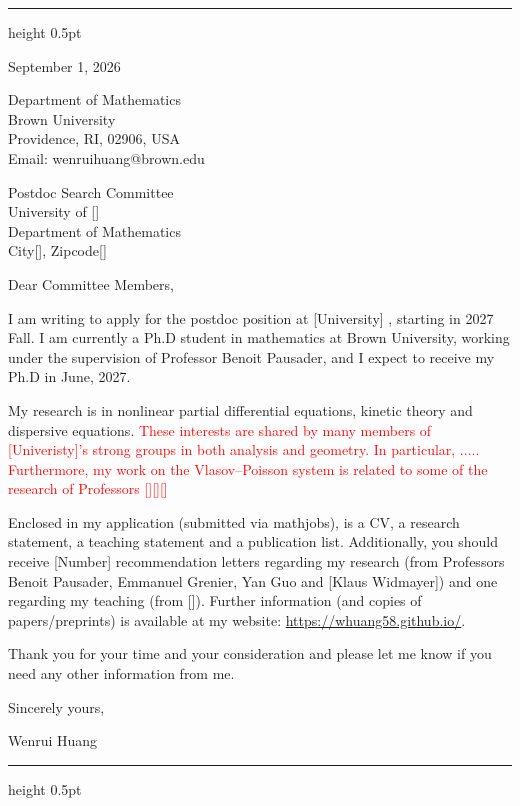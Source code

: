 \documentclass[10pt]{article}
\begin{document}
\vspace{0.08in}
\hrule height 0.5pt

\vspace{0.47in}
\hfill
\begin{minipage}{2.27in}
September 1, 2026

\vspace{0.16in}
Department of Mathematics\\
Brown University\\
Providence, RI, 02906, USA\\
Email: wenrui\textunderscore huang@brown.edu
\end{minipage}

\vspace{0.30in}
Postdoc Search Committee\\
University of []\\
Department of Mathematics\\
City[], Zipcode[]

\vspace{0.16in}
Dear Committee Members,

I am writing to apply for the postdoc position at
[University] , starting in 2027 Fall. I am currently a Ph.D student in mathematics at Brown University, working under the supervision of Professor Benoit Pausader, and I expect to receive my Ph.D in June, 2027. 

My research is in nonlinear partial differential equations, kinetic theory and dispersive equations.  {\textcolor{red} {These interests are shared by many members of [Univeristy]'s
strong groups in both analysis and geometry. In particular, ..... Furthermore, my work on the Vlasov--Poisson system is related to some of the
research of Professors [][][]}}

Enclosed in my application (submitted via mathjobs), is a CV, a research
statement, a teaching statement and a publication list. Additionally, you
should receive [Number] recommendation letters regarding my research (from
Professors Benoit Pausader, Emmanuel Grenier, Yan Guo and [Klaus Widmayer]) and one
regarding my teaching (from []). Further information
(and copies of papers/preprints) is available at my website:
\url{https://whuang58.github.io/}.

Thank you for your time and your consideration and please let me know if you
need any other information from me.

\vspace{0.12in}
Sincerely yours,

\vspace{0.33in}
Wenrui Huang

\vfill
\hrule height 0.5pt
\end{document}
